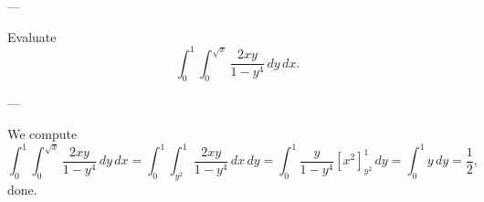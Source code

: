 
---

Evaluate \[\int_0^1\int_0^{\sqrt x}\frac{2xy}{1-y^4}\,dy\,dx.\]

---

We compute \[\int_0^1\int_0^{\sqrt x}\frac{2xy}{1-y^4}\,dy\,dx=\int_0^1\int_{y^2}^1\frac{2xy}{1-y^4}\,dx\,dy=\int_0^1\frac y{1-y^4}\left[x^2\right]^1_{y^2}\,dy=\int_0^1y\,dy=\frac12,\]
done.


